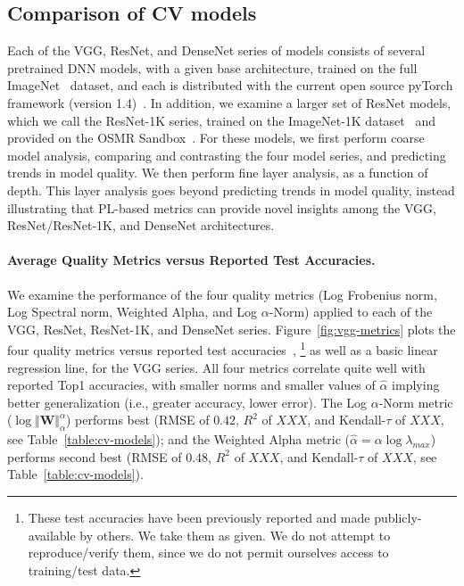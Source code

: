\subsection{Comparison of CV models}
\label{sxn:cv}

Each of the VGG, ResNet, and DenseNet series of models consists of several pretrained DNN models, with a given base architecture, trained on the full ImageNet~\cite{imagenet} dataset, and each is distributed with the current open source pyTorch framework (version 1.4)~\cite{pytorch}.
In addition, we examine a larger set of ResNet models, which we call the ResNet-1K series, trained on the ImageNet-1K dataset~\cite{imagenet} and provided on the OSMR Sandbox~\cite{osmr}.
For these models, we first perform coarse model analysis, comparing and contrasting the four model series, and predicting trends in model quality.
We then perform fine layer analysis, as a function of depth.
This layer analysis goes beyond predicting trends in model quality, instead illustrating that PL-based metrics can provide novel insights among the VGG, ResNet/ResNet-1K, and DenseNet architectures. 


\paragraph{Average Quality Metrics versus Reported Test Accuracies.}

We examine the performance of the four quality metrics (Log Frobenius norm, Log Spectral norm, Weighted Alpha, and Log $\alpha$-Norm) applied to each of the VGG, ResNet, ResNet-1K, and DenseNet series.
Figure~\ref{fig:vgg-metrics} 
plots the four quality metrics versus reported test accuracies~\cite{pytorch},%
\footnote{These test accuracies have been previously reported and made publicly-available by others.  We take them as given.  We do not attempt to reproduce/verify them, since we do not permit ourselves access to training/test data.}
as well as a basic linear regression line, for the VGG series.
All four metrics correlate quite well with reported Top1 accuracies, with smaller norms and smaller values of $\hat{\alpha}$ implying better generalization (i.e., greater accuracy, lower error). 
The Log $\alpha$-Norm metric ($\log\Vert\mathbf{W}\Vert_{\alpha}^{\alpha}$) performs best (RMSE of $0.42$, $R^2$ of $XXX$, and Kendall-$\tau$ of $XXX$, see Table~\ref{table:cv-models}); and the Weighted Alpha metric ($\hat\alpha =\alpha\log\lambda_{max} $) performs second best (RMSE of $0.48$, $R^2$ of $XXX$, and Kendall-$\tau$ of $XXX$, see Table~\ref{table:cv-models}).


